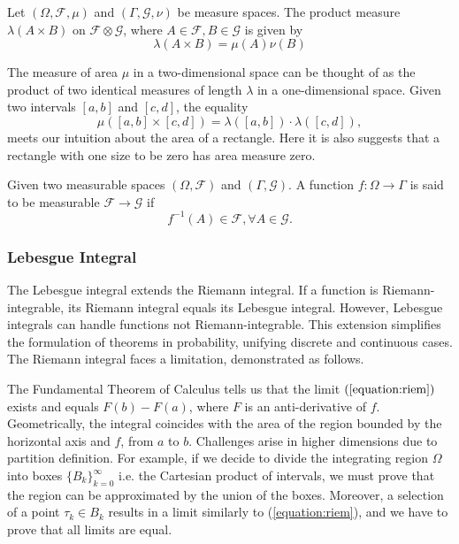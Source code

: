 \begin{definition}
    Let $(\Omega,\mathcal{F},\mu)$ and $(\Gamma,\mathcal{G},\nu)$ be measure spaces. The product measure $\lambda(A\times B)$ on $\mathcal{F}\otimes\mathcal{G}$, where $A\in\mathcal{F},B\in\mathcal{G}$ is given by
    $$\lambda(A\times B)=\mu(A)\nu(B)$$
\end{definition}

\begin{example}
    The measure of area $\mu$ in a two-dimensional space can be thought of as the product of two identical measures of length $\lambda$ in a one-dimensional space. Given two intervals $[a,b]$ and $[c,d]$, the equality
    $$\mu([a,b]\times [c,d])=\lambda([a,b])\cdot\lambda([c,d]),$$
    meets our intuition about the area of a rectangle. Here it is also suggests that a rectangle with one size to be zero has area measure zero.
\end{example}

\begin{definition}
    Given two measurable spaces $(\Omega, \mathcal{F})$ and $(\Gamma,\mathcal{G})$. A function $f:\Omega\to\Gamma$ is said to be measurable $\mathcal{F}\to\mathcal{G}$ if
    $$f^{-1}(A)\in\mathcal{F},\forall A\in \mathcal{G}.$$
\end{definition}

\subsubsection{Lebesgue Integral}
The Lebesgue integral extends the Riemann integral. If a function is Riemann-integrable, its Riemann integral equals its Lebesgue integral. However, Lebesgue integrals can handle functions not Riemann-integrable. This extension simplifies the formulation of theorems in probability, unifying discrete and continuous cases. The Riemann integral faces a limitation, demonstrated as follows.

The Fundamental Theorem of Calculus tells us that the limit $(\ref{equation:riem})$ exists and equals $F(b)-F(a)$, where $F$ is an anti-derivative of $f$. Geometrically, the integral coincides with the area of the region bounded by the horizontal axis and $f$, from $a$ to $b$. Challenges arise in higher dimensions due to partition definition. For example, if we decide to divide the integrating region $\Omega$ into boxes $\{B_k\}_{k=0}^\infty$ i.e. the Cartesian product of intervals, we must prove that the region can be approximated by the union of the boxes. Moreover, a selection of a point $\tau_k\in B_k$ results in a limit similarly to (\ref{equation:riem}), and we have to prove that all limits are equal.

